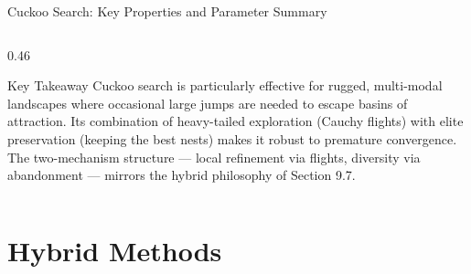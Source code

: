 \documentclass[aspectratio=169,10pt]{beamer}
\begin{document}
\begin{frame}[allowframebreaks]{Cuckoo Search: Key Properties and Parameter Summary}
\begin{columns}[T]
\begin{column}{0.46\textwidth}
      \begin{alertblock}{Key Takeaway}
        Cuckoo search is particularly effective for rugged,
        multi-modal landscapes where occasional large jumps are
        needed to escape basins of attraction.  Its combination of
        heavy-tailed exploration (Cauchy flights) with elite
        preservation (keeping the best nests) makes it robust to
        premature convergence.  The two-mechanism structure ---
        local refinement via flights, diversity via abandonment ---
        mirrors the hybrid philosophy of Section 9.7.
      \end{alertblock}
    \end{column}
  \end{columns}

\end{frame}

\section{Hybrid Methods}
\end{document}
